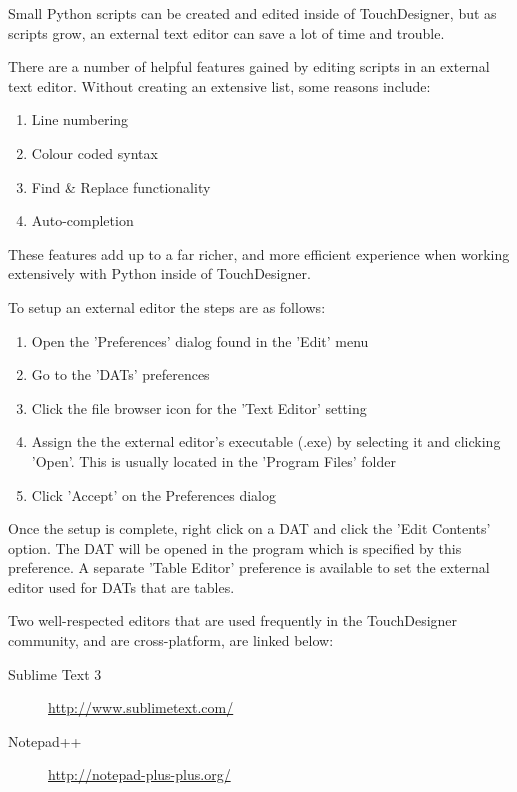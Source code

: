 \begin{fullwidth}

Small Python scripts can be created and edited inside of TouchDesigner, but as scripts grow, an external text editor can save a lot of time and trouble.

There are a number of helpful features gained by editing scripts in an external text editor. Without creating an extensive list, some reasons include:

\begin{enumerate}
\item Line numbering 
\item Colour coded syntax
\item Find \& Replace functionality
\item Auto-completion
\end{enumerate}

These features add up to a far richer, and more efficient experience when working extensively with Python inside of TouchDesigner.  

To setup an external editor the steps are as follows:

\begin{enumerate}
\item Open the 'Preferences' dialog found in the 'Edit' menu
\item Go to the 'DATs' preferences
\item Click the file browser icon for the 'Text Editor' setting
\item Assign the the external editor's executable (.exe) by selecting it and clicking 'Open'.  This is usually located in the 'Program Files' folder
\item Click 'Accept' on the Preferences dialog
\end{enumerate}

Once the setup is complete, right click on a DAT and click the 'Edit Contents' option. The DAT will be opened in the program which is specified by this preference.  A separate 'Table Editor' preference is available to set the external editor used for DATs that are tables.

Two well-respected editors that are used frequently in the TouchDesigner community, and are cross-platform, are linked below: 

\begin{description}
\item[Sublime Text 3] \url{http://www.sublimetext.com/}
\item[Notepad++] \url{http://notepad-plus-plus.org/}
\end{description}

\end{fullwidth}


